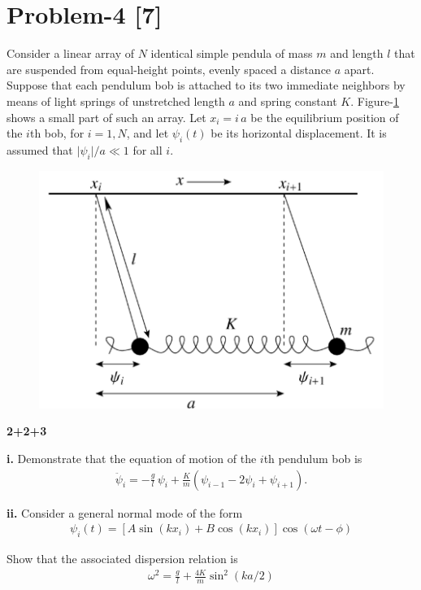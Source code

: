 \documentclass[12pt, a4paper]{article}
\begin{document}
\section*{Problem-4 \hfill \textbf{[7]}}
Consider a linear array of $N$ identical simple pendula of mass $m$ and length $l$ 
that are suspended from equal-height points, evenly spaced a distance $a$ apart. 
Suppose that each pendulum bob is attached to its two immediate neighbors by means 
of light springs of unstretched length $a$ and spring constant $K$. 
Figure-\ref{fig:pen-chain} shows a small part of such an array. Let $x_i=i\,a$ be
the equilibrium position of the $i$th bob, for $i=1,N$, and let $\psi_i(t)$ be its
horizontal displacement. It is assumed that $\vert\psi_i\vert/a\ll 1$ for all $i$.
\begin{figure}[h]
    \centering
    \includegraphics[scale=0.4]{figs/Pend-coupled-chain.png}
    \caption{}
    \label{fig:pen-chain}
\end{figure}\hfill\textbf{2+2+3}

\textbf{i.} Demonstrate that the equation of motion of the $i$th pendulum bob is
\begin{align*}
    \ddot{\psi}_i = - \frac{g}{l}\,\psi_i + \frac{K}{m}(\psi_{i-1}-2\psi_i+\psi_{i+1}).
\end{align*}

\textbf{ii.} Consider a general normal mode of the form
\begin{align*}
    \psi_i(t) = [A\sin (kx_i)+ B\cos(kx_i)]\cos(\omega t-\phi)
\end{align*}

Show that the associated dispersion relation is
\begin{align*}
    \omega^{2}= \frac{g}{l} + \frac{4K}{m}\sin^2(ka/2)
\end{align*}
\end{document}
